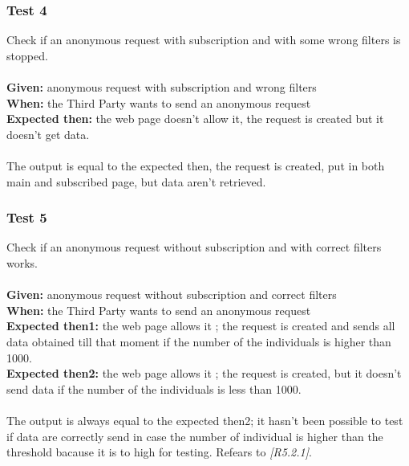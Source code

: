 \subsubsection{\Large{Test 4}}
Check if an anonymous request with subscription and with some wrong filters is stopped.\\
\\
\textbf{Given: } anonymous request with subscription and wrong filters\\
\textbf{When: } the Third Party wants to send an anonymous request\\
\textbf{Expected then: } the web page doesn't allow it, the request is created but it doesn't get data.\\
\\
The output is equal to the expected then, the request is created, put in both main and subscribed page, but data aren't retrieved.

\subsubsection{\Large{Test 5}}
Check if an anonymous request without subscription and with correct filters works.\\
\\
\textbf{Given: } anonymous request without subscription and correct filters\\
\textbf{When: } the Third Party wants to send an anonymous request\\
\textbf{Expected then1: }the web page allows it ; the request is created and sends all data obtained till that moment if the number of the individuals is higher than 1000.\\
\textbf{Expected then2: }the web page allows it ; the request is created, but it doesn't send data if the number of the individuals is less than 1000.\\
\\
The output is always equal to the expected then2; it hasn't been possible to test if data are correctly send in case the number of individual is higher than the threshold bacause it is to high for testing.
Refears to \textit{[R5.2.1]}.


